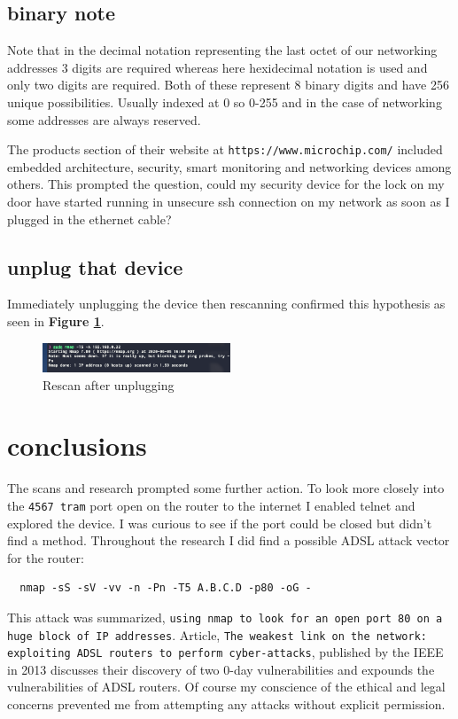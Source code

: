 \documentclass[10pt]{article}
\begin{document}
\subsection*{binary note}
Note that in the decimal notation representing the last octet of our networking addresses 3 digits are required
whereas here hexidecimal notation is used and only two digits are required. Both of these represent 8 binary digits
and have 256 unique possibilities. Usually indexed at 0 so 0-255 and in the case of networking some addresses are always reserved.
\medskip

The products section of their website at \verb|https://www.microchip.com/| included embedded architecture,
security, smart monitoring and networking devices among others.\cite{microchip} This prompted the question, could my security device
for the lock on my door have started running in unsecure ssh connection on my network as soon as I plugged in the 
ethernet cable?

\subsection*{unplug that device}
Immediately unplugging the device then rescanning confirmed this hypothesis as seen in \textbf{Figure \ref{down image}}.

\begin{figure}[H]
\centering
\includegraphics[width=0.5\textwidth]{down.png}
\caption{Rescan after unplugging}\label{down image}
\end{figure}




\section*{conclusions}
The scans and research prompted some further action. To look more closely into the \verb|4567 tram| port open on the router to the internet I enabled telnet and
explored the device. I was curious to see if the port could be closed but didn't find a method. Throughout the research I did find a possible ADSL attack vector 
for the router:\cite{techni}
\begin{verbatim}
  nmap -sS -sV -vv -n -Pn -T5 A.B.C.D -p80 -oG -
\end{verbatim}
This attack was summarized, \verb|using nmap to look for an open port 80 on a huge block of IP addresses|.\cite{techni} 
Article, \verb|The weakest link on the network: exploiting ADSL routers to perform cyber-attacks|, published by the IEEE 
in 2013 discusses their discovery of two 0-day vulnerabilities and expounds the vulnerabilities of ADSL routers.\cite{journal} Of course my conscience of the ethical and legal 
concerns prevented me from attempting any attacks without explicit permission.
\end{document}
